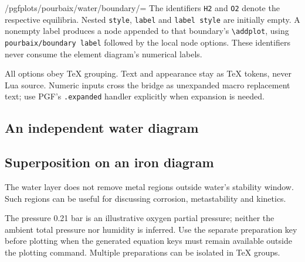 \documentclass[a4paper,11pt]{ltxdoc}
\begin{document}
\begin{key}{/pgfplots/pourbaix/water/boundary/=}
The identifiers \texttt{H2} and \texttt{O2} denote the respective equilibria.
Nested \texttt{style}, \texttt{label} and \texttt{label style} are initially empty.
A nonempty label produces a node appended to that boundary's \verb|\addplot|,
using \texttt{pourbaix/boundary label} followed by the local node options.
These identifiers never consume the element diagram's numerical labels.
\end{key}
All options obey TeX grouping. Text and appearance stay as TeX tokens, never Lua
source. Numeric inputs cross the bridge as unexpanded macro replacement text;
use PGF's \texttt{.expanded} handler explicitly when expansion is needed.

\subsection{An independent water diagram}
\begin{codeexample}[width=8cm]
\begin{tikzpicture}
\begin{axis}[pourbaix/axis,width=8cm,height=6cm,
 xmin=0,xmax=14,ymin=-1.2,ymax=1.5]
 \addpourbaixwater[
  prepare={temperature=298.15},
  domain fills=true,
  domain/H2O={label style={fill=white}},
  boundary/O2={label=$E_{\mathrm O_2}$,
    label style={above,pos=.75}}];
\end{axis}
\end{tikzpicture}
\end{codeexample}

\subsection{Superposition on an iron diagram}
The water layer does not remove metal regions outside water's stability window.
Such regions can be useful for discussing corrosion, metastability and kinetics.
\begin{codeexample}[width=8cm]
\end{codeexample}
The pressure 0.21 bar is an illustrative oxygen partial pressure; neither the
ambient total pressure nor humidity is inferred. Use the separate preparation
key before plotting when the generated equation keys must remain available
outside the plotting command. Multiple preparations can be isolated in TeX groups.
\end{document}

